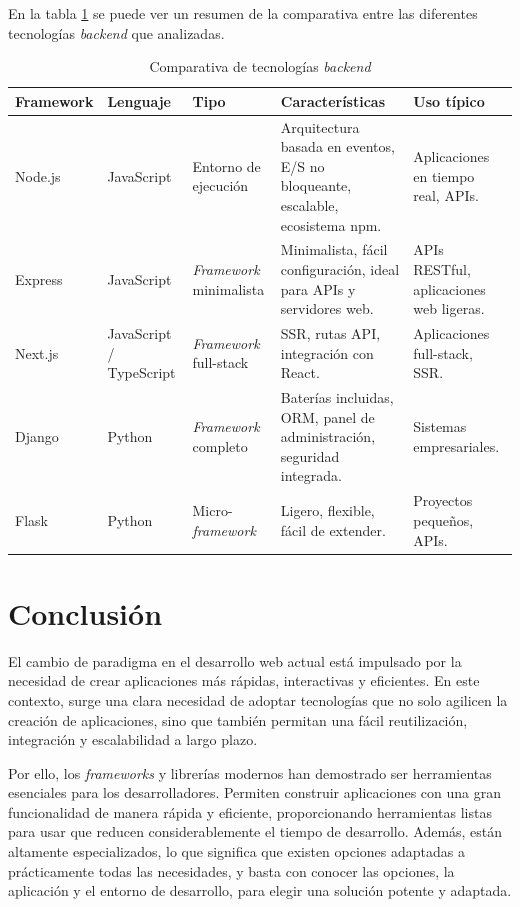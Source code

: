 En la tabla \ref{tab:backend_technologies} se puede ver un resumen de la comparativa entre las diferentes tecnologías \textit{backend} que analizadas.

\begin{table}[h!]
\centering
\small
\begin{tabularx}{\textwidth}{X X X p{4.5cm} p{3cm}}
\toprule
\textbf{Framework} & \textbf{Lenguaje} & \textbf{Tipo} & \textbf{Características} & \textbf{Uso típico} \\
\midrule
Node.js & JavaScript & Entorno de ejecución & Arquitectura basada en eventos, E/S no bloqueante, escalable, ecosistema npm. & Aplicaciones en tiempo real, APIs. \\
\midrule
Express & JavaScript & \textit{Framework} minimalista & Minimalista, fácil configuración, ideal para APIs y servidores web. & APIs RESTful, aplicaciones web ligeras. \\
\midrule
Next.js & JavaScript / TypeScript & \textit{Framework} full-stack & SSR, rutas API, integración con React. & Aplicaciones full-stack, SSR. \\
\midrule
Django & Python & \textit{Framework} completo & Baterías incluidas, ORM, panel de administración, seguridad integrada. & Sistemas empresariales. \\
\midrule
Flask & Python & Micro-\textit{framework} & Ligero, flexible, fácil de extender. & Proyectos pequeños, APIs. \\
\bottomrule
\end{tabularx}
\caption{Comparativa de tecnologías \textit{backend}}
\label{tab:backend_technologies}
\end{table}

\section{Conclusión}

El cambio de paradigma en el desarrollo web actual está impulsado por la necesidad de crear aplicaciones más rápidas, interactivas y eficientes. En este contexto, surge una clara necesidad de adoptar tecnologías que no solo agilicen la creación de aplicaciones, sino que también permitan una fácil reutilización, integración y escalabilidad a largo plazo.

Por ello, los \textit{frameworks} y librerías modernos han demostrado ser herramientas esenciales para los desarrolladores. Permiten construir aplicaciones con una gran funcionalidad de manera rápida y eficiente, proporcionando herramientas listas para usar que reducen considerablemente el tiempo de desarrollo. Además, están altamente especializados, lo que significa que existen opciones adaptadas a prácticamente todas las necesidades, y basta con conocer las opciones, la aplicación y el entorno de desarrollo, para elegir una solución potente y adaptada. 